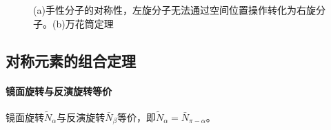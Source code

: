 \begin{figure}[]
    \centering
    \caption{(a)手性分子的对称性，左旋分子无法通过空间位置操作转化为右旋分子。(b)万花筒定理}
    \label{p006p007}
\end{figure}

\subsection{对称元素的组合定理}

\paragraph{镜面旋转与反演旋转等价}
镜面旋转$\tilde{N}_{\alpha} $与反演旋转$\bar{N}_{\beta}$等价，即$\tilde{N}_{\alpha} =  \bar{N}_{\pi - \alpha}$。

